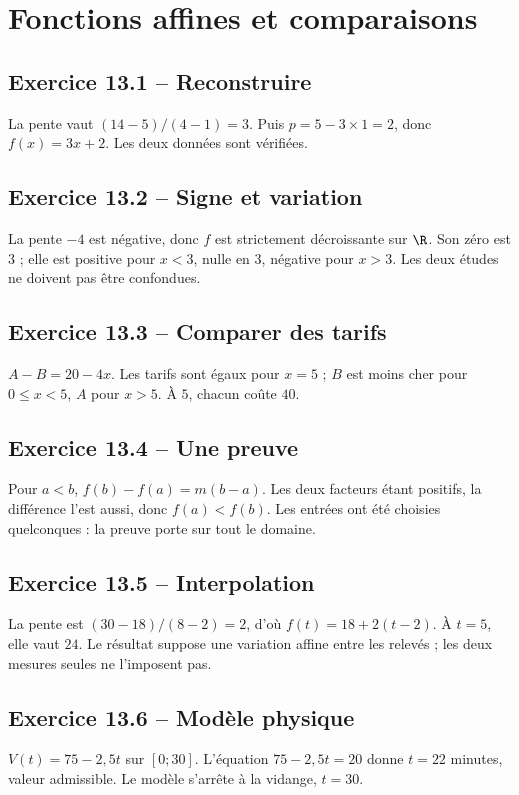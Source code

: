 \chapter{Fonctions affines et comparaisons}
\section*{Exercice 13.1 -- Reconstruire}
La pente vaut $(14-5)/(4-1)=3$. Puis $p=5-3\times1=2$, donc $f(x)=3x+2$. Les deux données sont vérifiées.

\section*{Exercice 13.2 -- Signe et variation}
La pente $-4$ est négative, donc $f$ est strictement décroissante sur $\R$. Son zéro est $3$ ; elle est positive pour $x<3$, nulle en $3$, négative pour $x>3$. Les deux études ne doivent pas être confondues.

\section*{Exercice 13.3 -- Comparer des tarifs}
$A-B=20-4x$. Les tarifs sont égaux pour $x=5$ ; $B$ est moins cher pour $0\leq x<5$, $A$ pour $x>5$. À $5$, chacun coûte $40$.

\section*{Exercice 13.4 -- Une preuve}
Pour $a<b$, $f(b)-f(a)=m(b-a)$. Les deux facteurs étant positifs, la différence l'est aussi, donc $f(a)<f(b)$. Les entrées ont été choisies quelconques : la preuve porte sur tout le domaine.

\section*{Exercice 13.5 -- Interpolation}
La pente est $(30-18)/(8-2)=2$, d'où $f(t)=18+2(t-2)$. À $t=5$, elle vaut $24$. Le résultat suppose une variation affine entre les relevés ; les deux mesures seules ne l'imposent pas.

\section*{Exercice 13.6 -- Modèle physique}
$V(t)=75-2{,}5t$ sur $[0;30]$. L'équation $75-2{,}5t=20$ donne $t=22$ minutes, valeur admissible. Le modèle s'arrête à la vidange, $t=30$.
